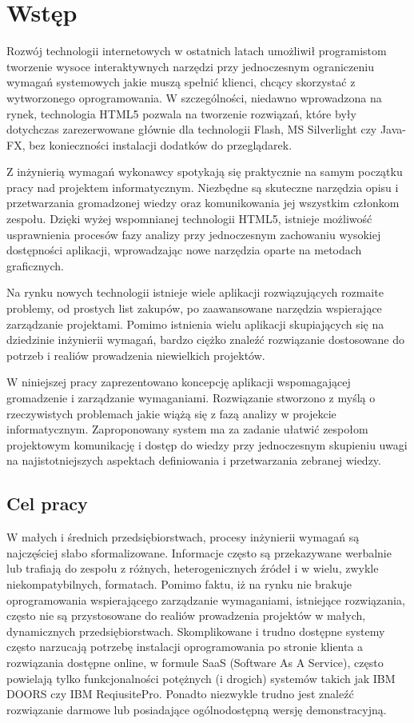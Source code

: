 \chapter{Wstęp}

    Rozwój technologii internetowych w ostatnich latach umożliwił programistom tworzenie wysoce interaktywnych narzędzi przy jednoczesnym ograniczeniu wymagań systemowych jakie muszą spełnić klienci, chcący skorzystać z wytworzonego oprogramowania. W szczególności, niedawno wprowadzona na rynek, technologia HTML5 pozwala na tworzenie rozwiązań, które były dotychczas zarezerwowane głównie dla technologii Flash, MS Silverlight czy Java-FX, bez konieczności instalacji dodatków do przeglądarek.

    Z inżynierią wymagań wykonawcy spotykają się praktycznie na samym początku pracy nad projektem informatycznym. Niezbędne są skuteczne narzędzia opisu i przetwarzania gromadzonej wiedzy oraz komunikowania jej wszystkim członkom zespołu. Dzięki wyżej wspomnianej technologii HTML5, istnieje możliwość usprawnienia procesów fazy analizy przy jednoczesnym zachowaniu wysokiej dostępności aplikacji, wprowadzając nowe narzędzia oparte na metodach graficznych. 

    Na rynku nowych technologii istnieje wiele aplikacji rozwiązujących rozmaite problemy, od prostych list zakupów, po zaawansowane narzędzia wspierające zarządzanie projektami. Pomimo istnienia wielu aplikacji skupiających się na dziedzinie inżynierii wymagań, bardzo ciężko znaleźć rozwiązanie dostosowane do potrzeb i realiów prowadzenia niewielkich projektów. 
          
    W niniejszej pracy zaprezentowano koncepcję aplikacji wspomagającej gromadzenie i zarządzanie wymaganiami. Rozwiązanie stworzono z myślą o rzeczywistych problemach jakie wiążą się z fazą analizy w projekcie informatycznym. Zaproponowany system ma za zadanie ułatwić zespołom projektowym komunikację i dostęp do wiedzy przy jednoczesnym skupieniu uwagi na najistotniejszych aspektach definiowania i przetwarzania zebranej wiedzy.


    \section{Cel pracy}

      W małych i średnich przedsiębiorstwach, procesy inżynierii wymagań są najczęściej słabo sformalizowane. Informacje często są przekazywane werbalnie lub trafiają do zespołu z różnych, heterogenicznych źródeł i w wielu, zwykle niekompatybilnych, formatach. Pomimo faktu, iż na rynku nie brakuje oprogramowania wspierającego zarządzanie wymaganiami, istniejące rozwiązania, często nie są przystosowane do realiów prowadzenia projektów w małych, dynamicznych przedsiębiorstwach. Skomplikowane i trudno dostępne systemy często narzucają potrzebę instalacji oprogramowania po stronie klienta a rozwiązania dostępne online, w formule SaaS (Software As A Service), często powielają tylko funkcjonalności potężnych (i drogich) systemów takich jak IBM DOORS czy IBM ReqiusitePro. Ponadto niezwykle trudno jest znaleźć rozwiązanie darmowe lub posiadające ogólnodostępną wersję demonstracyjną. 

